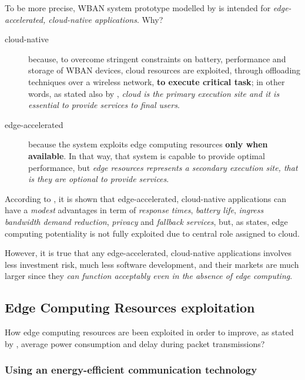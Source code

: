 \documentclass[sigchi]{acmart}
\begin{document}
To be more precise, WBAN system prototype modelled by \citet{MSAReport} is intended for \textit{edge-accelerated, cloud-native applications}. Why?

\begin{description}

\item[cloud-native] because, to overcome stringent constraints on battery, performance and storage of WBAN devices, cloud resources are exploited, through offloading techniques over a wireless network, \textbf{to execute critical task}; in other words, as stated also by \citet{MSAReport}, \textit{cloud is the primary execution site and it is essential to provide services to final users}.

\item[edge-accelerated] because the system exploits edge computing resources \textbf{only when available}. In that way, that system is capable to provide optimal performance, but \textit{edge resources represents a secondary execution site, that is they are optional to provide services}.

\end{description}

According to \citet{TheSeminalRoleEdgeNativeApplications}, it is shown that edge-accelerated, cloud-native applications can have a \textit{modest} advantages in term of \textit{response times}, \textit{battery life}, \textit{ingress bandwidth demand reduction}, \textit{privacy} and \textit{fallback services}\cite{TheSeminalRoleEdgeNativeApplications}\citep{TheEmergenceOfEdgeComputing}, but, as \citet{TheSeminalRoleEdgeNativeApplications} states, edge computing potentiality is not fully exploited due to central role assigned to cloud.

However, it is true that any edge-accelerated, cloud-native applications involves less investment risk, much less software development, and their markets are much larger since they \textit{can function acceptably even in the absence of edge computing}.

\subsection{Edge Computing Resources exploitation}

How edge computing resources are been exploited in order to improve, as stated by \citet{MSAReport}, average power consumption and delay during packet transmissions? 

\subsubsection{Using an energy-efficient communication technology}
\end{document}
